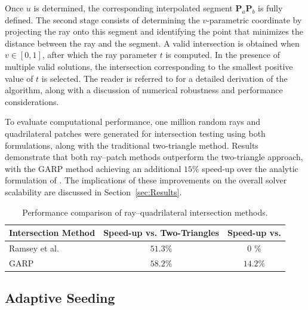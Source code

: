 Once $u$ is determined, the corresponding interpolated segment $\boldsymbol{P}_a\boldsymbol{P}_b$ is fully defined. The second stage consists of determining the $v$-parametric coordinate by projecting the ray onto this segment and identifying the point that minimizes the distance between the ray and the segment. A valid intersection is obtained when $v \in [0,1]$, after which the ray parameter $t$ is computed. In the presence of multiple valid solutions, the intersection corresponding to the smallest positive value of $t$ is selected. The reader is referred to \cite{Reshetov_2019} for a detailed derivation of the algorithm, along with a discussion of numerical robustness and performance considerations.

To evaluate computational performance, one million random rays and quadrilateral patches were generated for intersection testing using both formulations, along with the traditional two-triangle method. 
Results demonstrate that both ray--patch methods outperform the two-triangle approach, with the GARP method achieving an additional $15\%$ speed-up over the analytic formulation of \cite{Ramsey_2004}. 
The implications of these improvements on the overall solver scalability are discussed in Section~\ref{sec:Results}.

\begin{table}[htb!]
\centering
\caption{Performance comparison of ray--quadrilateral intersection methods.}
\hspace*{-0.5cm}
\label{tab:quad_intersections}
\begin{tabular}{lcc}
\hline
\hline
\textbf{Intersection Method} & \textbf{Speed-up vs. Two-Triangles} & \textbf{Speed-up vs. \cite{Ramsey_2004}} \\
\hline\hline
Ramsey et al.~\cite{Ramsey_2004} & $51.3\%$ & 0 \% \\
GARP~\cite{Reshetov_2019} & $58.2\%$ & $14.2\%$ \\
\hline
\hline
\end{tabular}
\end{table}

\subsection{Adaptive Seeding}

